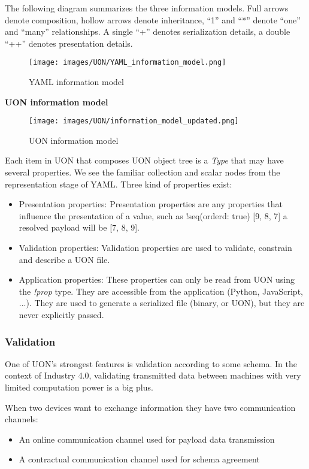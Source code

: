 \documentclass[12pt]{article}
\begin{document}
The following diagram summarizes the three information models. Full arrows denote composition, hollow arrows denote inheritance, “1” and “*” denote “one” and “many” relationships. A single “+” denotes serialization details, a double “++” denotes presentation details. 
\begin{figure}[ht!]
 	\centering
 	\caption{YAML information model}
 	\texttt{[image: images/UON/YAML\_information\_model.png]}
 	\label{lab:perceptron}
\end{figure}

\textbf{UON information model}

\begin{figure}[ht!]
 	\centering
 	\caption{UON information model}
 	\texttt{[image: images/UON/information\_model\_updated.png]}
 	\label{lab:perceptron}
\end{figure}

Each item in UON that composes UON object tree is a \emph{Type} that may have several properties. 
We see the familiar collection and scalar nodes from the representation stage of YAML.
Three kind of properties exist:
\begin{itemize}
    \item Presentation properties: Presentation properties are any properties that influence the presentation of a value, such as !seq(orderd: true) [9, 8, 7] a resolved payload will be [7, 8, 9].
    \item Validation properties: Validation properties are used to validate, constrain and describe a UON file.
    \item Application properties: These properties can only be read from UON using the \emph{!prop} type. They are accessible from the application (Python, JavaScript, ...). They are used to generate a serialized file (binary, or UON), but they are never explicitly passed.
\end{itemize}

\subsubsection{Validation}
One of UON’s strongest features is validation according to some schema. In the context of Industry 4.0, validating transmitted data between machines with very limited computation power is a big plus. 

When two devices want to exchange information they have two communication channels:
\begin{itemize}
    \item An online communication channel used for payload data transmission
    \item A contractual communication channel used for schema agreement
\end{itemize}
\end{document}
